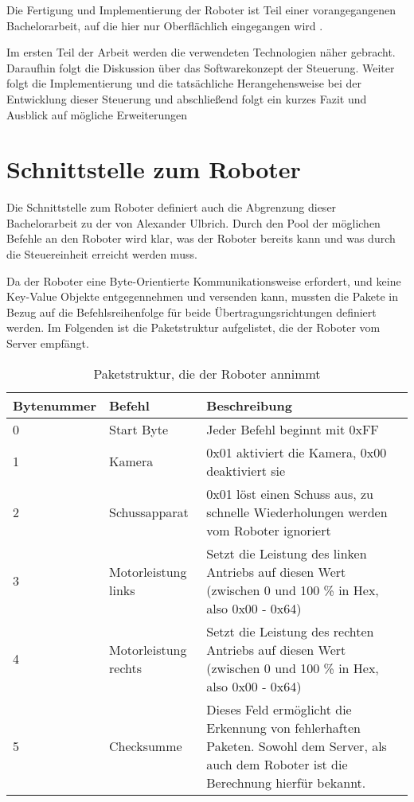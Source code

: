 Die Fertigung und Implementierung der Roboter ist Teil einer vorangegangenen Bachelorarbeit, auf die hier nur Oberflächlich eingegangen wird \cite{ALEX}. 

Im ersten Teil der Arbeit werden die verwendeten Technologien näher gebracht. Daraufhin folgt die Diskussion über das Softwarekonzept der Steuerung. Weiter folgt die Implementierung und die tatsächliche Herangehensweise bei der Entwicklung dieser Steuerung und abschließend folgt ein kurzes Fazit und Ausblick auf mögliche Erweiterungen
             



\section{Schnittstelle zum Roboter}
\label{sec:schnittstelle}
Die Schnittstelle zum Roboter definiert auch die Abgrenzung dieser Bachelorarbeit zu der von Alexander Ulbrich. Durch den Pool der möglichen Befehle an den Roboter wird klar, was der Roboter bereits kann und was durch die Steuereinheit erreicht werden muss. 

Da der Roboter eine Byte-Orientierte Kommunikationsweise erfordert, und keine Key-Value Objekte entgegennehmen und versenden kann, mussten die Pakete in Bezug auf die Befehlsreihenfolge für beide Übertragungsrichtungen definiert werden.
Im Folgenden ist die Paketstruktur aufgelistet, die der Roboter vom Server empfängt. \\

\begin{table}[h]
\begin{tabular}{||p{}||p{}||p{}||}
	\hline Bytenummer & Befehl & Beschreibung \\ 
	\hline 0 & Start Byte &  Jeder Befehl beginnt mit 0xFF\\ 
	\hline 1 & Kamera & 0x01 aktiviert die Kamera, 0x00 deaktiviert sie \\ 
	\hline 2 & Schussapparat & 0x01 löst einen Schuss aus, zu schnelle Wiederholungen werden vom Roboter ignoriert \\ 
	\hline 3 & Motorleistung links & Setzt die Leistung des linken Antriebs auf diesen Wert (zwischen 0 und 100 \% in Hex, also 0x00 - 0x64) \\ 
	\hline 4 & Motorleistung rechts & Setzt die Leistung des rechten Antriebs auf diesen Wert (zwischen 0 und 100 \% in Hex, also 0x00 - 0x64) \\ 
	\hline 5 & Checksumme & Dieses Feld ermöglicht die Erkennung von fehlerhaften Paketen. Sowohl dem Server, als auch dem Roboter ist die Berechnung hierfür bekannt. \\
	\hline
\end{tabular}  
\caption{Paketstruktur, die der Roboter annimmt}
\label{tab:serv_to_robot}
\end{table}



